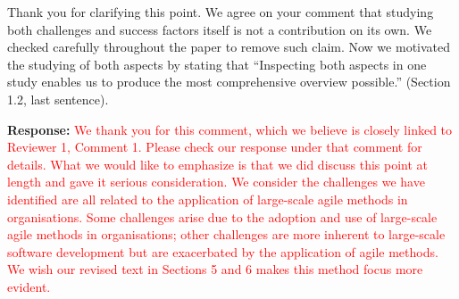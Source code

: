 \documentclass[a4paper,twoside,11pt]{reviewresponse}
\begin{document}
Thank you for clarifying this point. We agree on your comment that studying both challenges and success factors itself is not a contribution on its own. We checked carefully throughout the paper to remove such claim. Now we motivated the studying of both aspects by stating that  ``Inspecting both aspects in one study enables us to produce the most comprehensive overview possible.'' (Section 1.2, last sentence). %

\textbf{Response:}
\textcolor{red}{We thank you for this comment, which we believe is closely linked to Reviewer 1, Comment 1. Please check our response under that comment for details. What we would like to emphasize is that we did discuss this point at length and gave it serious consideration. We consider the challenges we have identified are all related to the application of large-scale agile methods in organisations. Some challenges arise due to the adoption and use of large-scale agile methods in organisations; other challenges are more inherent to large-scale software development but are exacerbated by the application of agile methods. We wish our revised text in Sections 5 and 6 makes this method focus more evident.}
\end{document}
